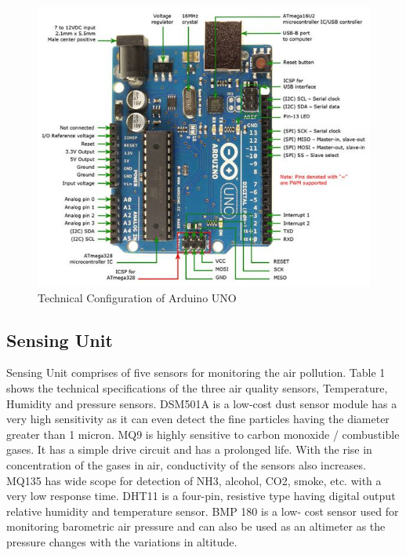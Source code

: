 \begin{figure}[!ht]
\centering
\includegraphics[scale=0.7]{figures/arduino-pin.jpg}
\caption{\label{img36} Technical Configuration of Arduino UNO}
\end{figure}

\subsection{Sensing Unit}

Sensing Unit comprises of five sensors for monitoring the
air pollution. Table 1 shows the technical specifications of the
three air quality sensors, Temperature, Humidity and pressure
sensors. DSM501A is a low-cost dust sensor module has a
very high sensitivity as it can even detect the fine particles
having the diameter greater than 1 micron. MQ9 is highly
sensitive to carbon monoxide / combustible gases. It has a
simple drive circuit and has a prolonged life. With the rise in
concentration of the gases in air, conductivity of the sensors
also increases. MQ135 has wide scope for detection of NH3,
alcohol, CO2, smoke, etc. with a very low response time.
DHT11 is a four-pin, resistive type having digital output
relative humidity and temperature sensor. BMP 180 is a low-
cost sensor used for monitoring barometric air pressure and
can also be used as an altimeter as the pressure changes with
the variations in altitude.

